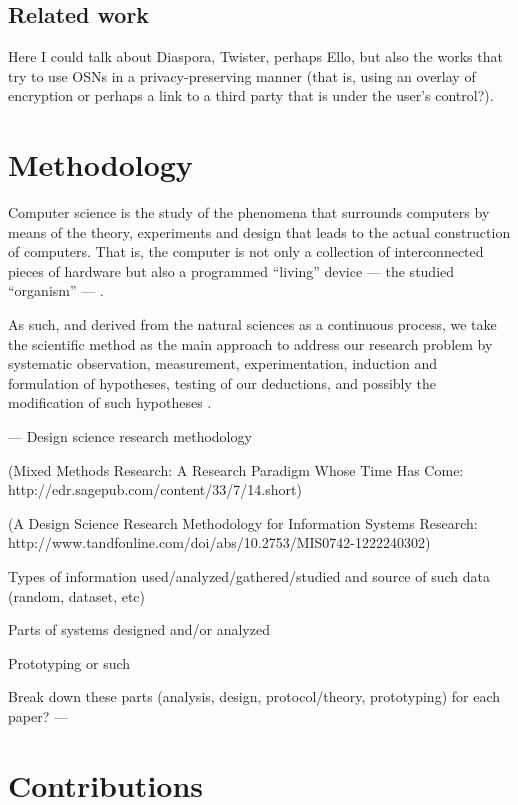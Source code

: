 \documentclass[showtrims,oldfontcommands]{kthesis}
\begin{document}
\section{Related work}

Here I could talk about Diaspora, Twister, perhaps Ello, but also the works that try to 
use OSNs in a privacy-preserving manner (that is, using an overlay of encryption 
or perhaps a link to a third party that is under the user's control?).

\chapter{Methodology}
Computer science is the study of the phenomena that surrounds computers by means 
of the theory, experiments and design that leads to the actual construction of computers. 
That is, the computer is not only a collection of interconnected pieces of hardware 
but also a programmed ``living'' device --- the studied ``organism'' --- \cite{NewellS76}.

As such, and derived from the natural sciences as a continuous process, we take 
the scientific method as the main approach to address our research problem by systematic 
observation, measurement, experimentation, induction and formulation of hypotheses, 
testing of our deductions, and possibly the modification of such hypotheses \cite{Oxford14}.

---
Design science research methodology

(Mixed Methods Research: A Research Paradigm Whose Time Has Come: http://edr.sagepub.com/content/33/7/14.short)

(A Design Science Research Methodology for Information Systems Research: http://www.tandfonline.com/doi/abs/10.2753/MIS0742-1222240302)

Types of information used/analyzed/gathered/studied and source of such data (random, dataset, etc)

Parts of systems designed and/or analyzed

Prototyping or such

Break down these parts (analysis, design, protocol/theory, prototyping) for each 
paper?
---

\chapter{Contributions}
\renewcommand\thesection{\Alph{section}}
\end{document}
